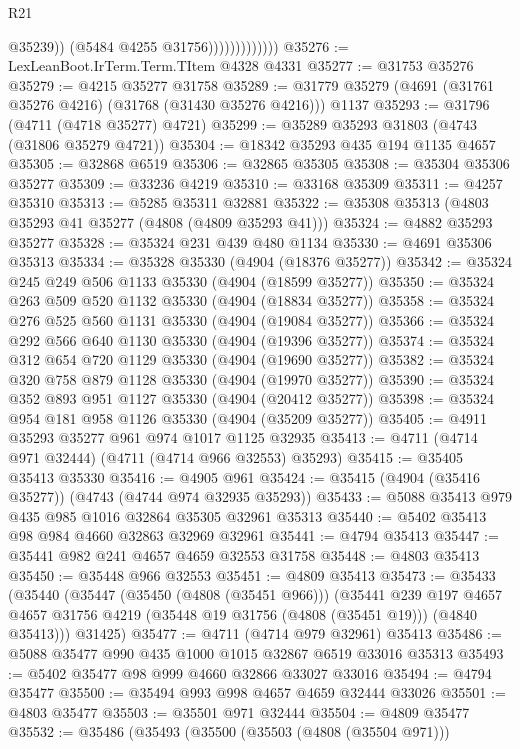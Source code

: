 \begin{lexlean}{R21}
\begin{coremodule}
                                @35239))
                            (@5484 @4255 @31756)))))))))))))
@35276 := LexLeanBoot.IrTerm.Term.TItem @4328 @4331
@35277 := @31753 @35276
@35279 := @4215 @35277 @31758
@35289 := @31779 @35279 (@4691 (@31761 @35276 @4216) (@31768 (@31430 @35276 @4216))) @1137
@35293 := @31796 (@4711 (@4718 @35277) @4721)
@35299 := @35289 @35293 @31803 (@4743 (@31806 @35279 @4721))
@35304 := @18342 @35293 @435 @194 @1135 @4657
@35305 := @32868 @6519
@35306 := @32865 @35305
@35308 := @35304 @35306 @35277
@35309 := @33236 @4219
@35310 := @33168 @35309
@35311 := @4257 @35310
@35313 := @5285 @35311 @32881
@35322 := @35308 @35313 (@4803 @35293 @41 @35277 (@4808 (@4809 @35293 @41)))
@35324 := @4882 @35293 @35277
@35328 := @35324 @231 @439 @480 @1134
@35330 := @4691 @35306 @35313
@35334 := @35328 @35330 (@4904 (@18376 @35277))
@35342 := @35324 @245 @249 @506 @1133 @35330 (@4904 (@18599 @35277))
@35350 := @35324 @263 @509 @520 @1132 @35330 (@4904 (@18834 @35277))
@35358 := @35324 @276 @525 @560 @1131 @35330 (@4904 (@19084 @35277))
@35366 := @35324 @292 @566 @640 @1130 @35330 (@4904 (@19396 @35277))
@35374 := @35324 @312 @654 @720 @1129 @35330 (@4904 (@19690 @35277))
@35382 := @35324 @320 @758 @879 @1128 @35330 (@4904 (@19970 @35277))
@35390 := @35324 @352 @893 @951 @1127 @35330 (@4904 (@20412 @35277))
@35398 := @35324 @954 @181 @958 @1126 @35330 (@4904 (@35209 @35277))
@35405 := @4911 @35293 @35277 @961 @974 @1017 @1125 @32935
@35413 := @4711 (@4714 @971 @32444) (@4711 (@4714 @966 @32553) @35293)
@35415 := @35405 @35413 @35330
@35416 := @4905 @961
@35424 := @35415 (@4904 (@35416 @35277)) (@4743 (@4744 @974 @32935 @35293))
@35433 := @5088 @35413 @979 @435 @985 @1016 @32864 @35305 @32961 @35313
@35440 := @5402 @35413 @98 @984 @4660 @32863 @32969 @32961
@35441 := @4794 @35413
@35447 := @35441 @982 @241 @4657 @4659 @32553 @31758
@35448 := @4803 @35413
@35450 := @35448 @966 @32553
@35451 := @4809 @35413
@35473 := @35433
    (@35440
      (@35447
        (@35450 (@4808 (@35451 @966)))
        (@35441
          @239
          @197
          @4657
          @4657
          @31756
          @4219
          (@35448 @19 @31756 (@4808 (@35451 @19)))
          (@4840 @35413)))
      @31425)
@35477 := @4711 (@4714 @979 @32961) @35413
@35486 := @5088 @35477 @990 @435 @1000 @1015 @32867 @6519 @33016 @35313
@35493 := @5402 @35477 @98 @999 @4660 @32866 @33027 @33016
@35494 := @4794 @35477
@35500 := @35494 @993 @998 @4657 @4659 @32444 @33026
@35501 := @4803 @35477
@35503 := @35501 @971 @32444
@35504 := @4809 @35477
@35532 := @35486
    (@35493
      (@35500
        (@35503 (@4808 (@35504 @971)))

\end{coremodule}
\end{lexlean}
